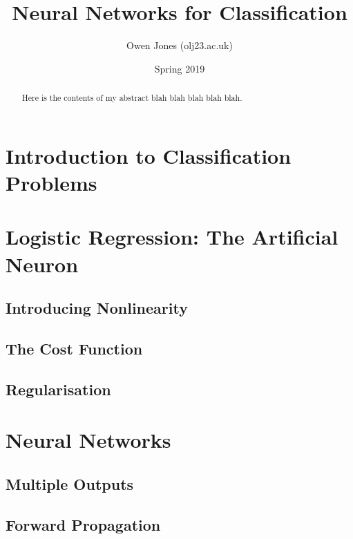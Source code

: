\documentclass{article}
\begin{document}
	
	
	\title{Neural Networks for Classification}
	\author{Owen Jones (olj23\@bath.ac.uk)}
	\date{Spring 2019}
	\maketitle


\begin{abstract}
	Here is the contents of my abstract blah blah blah blah blah.
\end{abstract}



\section{Introduction to Classification Problems}



\section{Logistic Regression: The Artificial Neuron}

    \subsection{Introducing Nonlinearity}

    \subsection{The Cost Function}

    \subsection{Regularisation}



\section{Neural Networks}

    \subsection{Multiple Outputs}
    
    \subsection{Forward Propagation}
\end{document}
